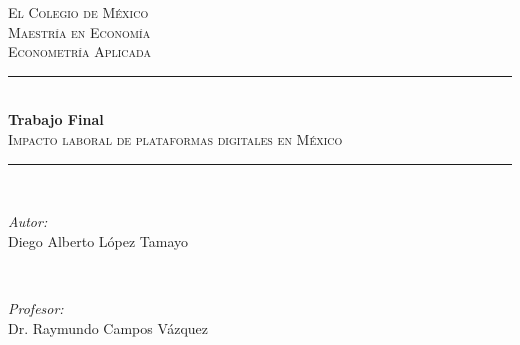 \begin{titlepage}
	
	\newcommand{\HRule}{\rule{\linewidth}{0.5mm}} %
	
	\center %
	
	
	\textsc{\LARGE El Colegio de México}\\[1.5cm] %
	\textsc{\Large Maestría en Economía}\\[1cm] %
	\textsc{\large  Econometría Aplicada}\\[1.5cm] 
	
	
	\HRule \\[0.4cm]
	{ \Large \bfseries Trabajo Final}\\[0.4cm] %
	\textsc{\Large Impacto laboral de plataformas digitales en México}\\[1cm] %
	\HRule \\[1.2cm]
	
	
	\begin{minipage}{0.4\textwidth}
		\begin{flushleft} \large
			\emph{Autor:}\\
Diego Alberto López Tamayo \\

		\end{flushleft}
	\end{minipage}
	~
	\begin{minipage}{0.4\textwidth}
		\begin{flushright} \large
			\emph{Profesor:} \\
			 Dr. Raymundo Campos Vázquez%
		\end{flushright}
	\end{minipage}\\[2cm]
	

\end{titlepage}
